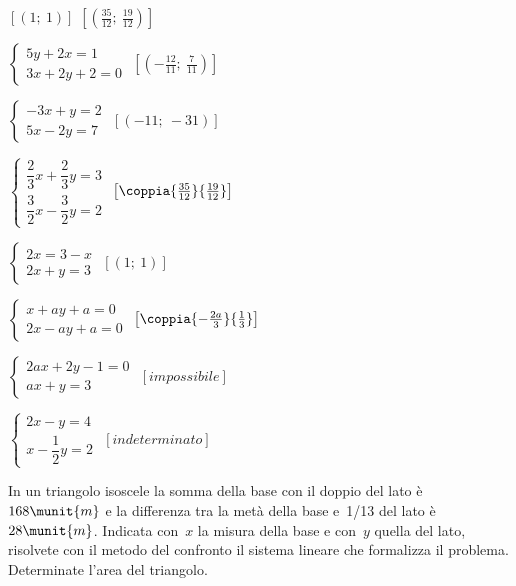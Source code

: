 \begin{esercizio}[*]
\begin{htmulticols}{2}
\begin{enumeratea}
 \hfill \(\left[(1;~1)\right]\)
 \hfill \(\left[\left(\frac{35}{12};~\frac{19}{12}\right)\right]\)
 \item \(\left\{\begin{array}{l}5y+2x=1 \\3x+2y+2=0\end{array}\right.\)
 \hfill \(\left[\left(-{\frac{12}{11}};~\frac{7}{11}\right)\right]\)
 \item \(\left\{\begin{array}{l}-3x+y=2\\5x-2y=7\end{array}\right.\)
 \hfill \(\left[(-11;~-31)\right]\)
 \item \(\left\{\begin{array}{l}
 \dfrac{2}{3}x+\dfrac{2}{3}y=3\\
 \dfrac{3}{2}x-\dfrac{3}{2}y=2\end{array}\right.\)
 \hfill \(\left[\coppia{\frac{35}{12}}{\frac{19}{12}}\right]\)
 \item \(\left\{\begin{array}{l}2x=3-x\\2x+y=3\end{array}\right.\)
 \hfill \(\left[(1;~1)\right]\)
 \item \(\left\{\begin{array}{l}x+ay+a=0\\2x-ay+a=0\end{array}\right.\)
 \hfill \(\left[\coppia{-\frac{2a}{3}}{\-\frac{1}{3}}\right]\)
 \item \(\left\{\begin{array}{l}2ax+2y-1=0\\ax+y=3\end{array}\right.\)
 \hfill \(\left[impossibile\right]\)
 \item \(\left\{\begin{array}{l}2x-y=4\\x-\dfrac{1}{2}y=2\end{array}\right.\)
 \hfill \(\left[indeterminato\right]\)
\end{enumeratea}
 \end{htmulticols}
\end{esercizio}

\begin{esercizio}
 \label{ese:22.19}
In un triangolo isoscele la somma della base con il doppio del lato
è~\(168\munit{m}\) e la differenza tra la metà della base e~1/13 del lato 
è~\(28\munit{m}\).
Indicata con~\(x\) la misura della base e con~\(y\) quella del lato,
risolvete con il metodo del confronto il sistema lineare che formalizza
il problema. Determinate l'area del triangolo.
 \end{esercizio}

